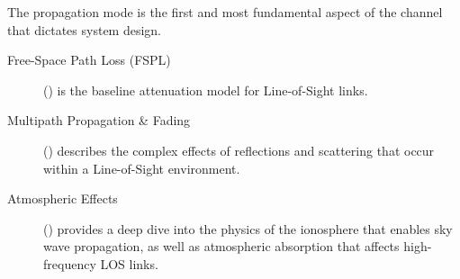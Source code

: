 \begin{importantbox}[title={Further Reading}]
    The propagation mode is the first and most fundamental aspect of the channel that dictates system design.
    \begin{description}
        \item[Free-Space Path Loss (FSPL)] () is the baseline attenuation model for Line-of-Sight links.
        \item[Multipath Propagation \& Fading] () describes the complex effects of reflections and scattering that occur within a Line-of-Sight environment.
        \item[Atmospheric Effects] () provides a deep dive into the physics of the ionosphere that enables sky wave propagation, as well as atmospheric absorption that affects high-frequency LOS links.
    \end{description}
\end{importantbox}